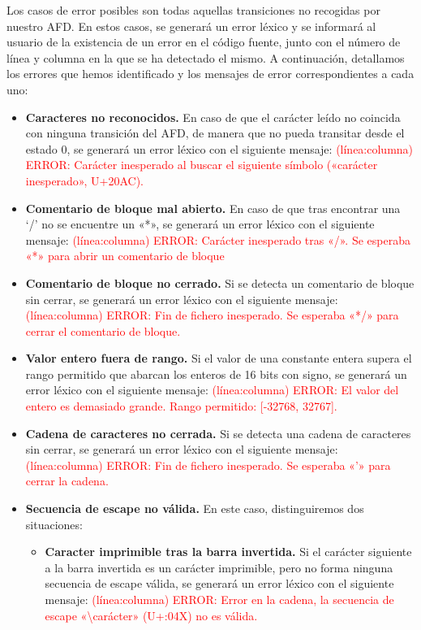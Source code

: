Los casos de error posibles son todas aquellas transiciones no recogidas por nuestro AFD. En estos casos, se generará un error léxico y se informará al usuario de la existencia de un error en el código fuente, junto con el número de línea y columna en la que se ha detectado el mismo. A continuación, detallamos los errores que hemos identificado y los mensajes de error correspondientes a cada uno:\\
\begin{itemize}[left=1cm]
    \item \textbf{Caracteres no reconocidos.} En caso de que el carácter leído no coincida con ninguna transición del AFD, de manera que no pueda transitar desde el estado 0, se generará un error léxico con el siguiente mensaje: \textcolor{red}{(línea:columna) ERROR: Carácter inesperado al buscar el siguiente símbolo («carácter inesperado», U+20AC).}
    \item \textbf{Comentario de bloque mal abierto.} En caso de que tras encontrar una `/' no se encuentre un «*», se generará un error léxico con el siguiente mensaje: \textcolor{red}{(línea:columna) ERROR: Carácter inesperado tras «/». Se esperaba «*» para abrir un comentario de bloque}
    \item \textbf{Comentario de bloque no cerrado.} Si se detecta un comentario de bloque sin cerrar, se generará un error léxico con el siguiente mensaje: \textcolor{red}{(línea:columna) ERROR: Fin de fichero inesperado. Se esperaba «*/» para cerrar el comentario de bloque.}
    \item \textbf{Valor entero fuera de rango.} Si el valor de una constante entera supera el rango permitido que abarcan los enteros de 16 bits con signo, se generará un error léxico con el siguiente mensaje: \textcolor{red}{(línea:columna) ERROR: El valor del entero es demasiado grande. Rango permitido: [-32768, 32767].}
    \item \textbf{Cadena de caracteres no cerrada.} Si se detecta una cadena de caracteres sin cerrar, se generará un error léxico con el siguiente mensaje: \textcolor{red}{(línea:columna) ERROR: Fin de fichero inesperado. Se esperaba «'» para cerrar la cadena.}
    \item \textbf{Secuencia de escape no válida.} En este caso, distinguiremos dos situaciones:
    \begin{itemize}
        \item \textbf{Caracter imprimible tras la barra invertida.} Si el carácter siguiente a la barra invertida es un carácter imprimible, pero no forma ninguna secuencia de escape válida, se generará un error léxico con el siguiente mensaje: \textcolor{red}{(línea:columna) ERROR: Error en la cadena, la secuencia de escape «\textbackslash carácter» (U+{:04X}) no es válida.}

\end{itemize}
\end{itemize}
